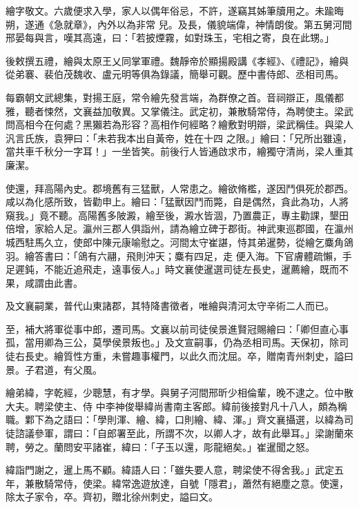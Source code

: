 \begin{pinyinscope}
 繪字敬文。六歲便求入學，家人以偶年俗忌，不許，遂竊其姊筆牘用之。未踰晦朔，遂通《急就章》，內外以為非常
 兒。及長，儀貌端偉，神情朗俊。第五舅河間邢晏每與言，嘆其高遠，曰：「若披煙霧，如對珠玉，宅相之寄，良在此甥。」



 後敕撰五禮，繪與太原王乂同掌軍禮。魏靜帝於顯揚殿講《孝經》、《禮記》，繪與從弟褰、裴伯茂魏收、盧元明等俱為錄議，簡舉可觀。歷中書侍郎、丞相司馬。



 每霸朝文武總集，對揚王庭，常令繪先發言端，為群僚之首。音祠辯正，風儀都雅，聽者悚然，文襄益加敬異。又掌儀注。武定初，兼散騎常侍，為聘使主。梁武問高相今在何處？黑獺若為形容？高相作何經略？繪敷對明辯，梁武稱佳。與梁人汎言氏族，袁狎曰：「未若我本出自黃帝，姓在十四
 之限。」繪曰：「兄所出雖遠，當共車千秋分一字耳！」一坐皆笑。前後行人皆通啟求市，繪獨守清尚，梁人重其廉潔。



 使還，拜高陽內史。郡境舊有三猛獸，人常患之。繪欲脩檻，遂因鬥俱死於郡西。咸以為化感所致，皆勸申上。繪曰：「猛獸因鬥而斃，自是偶然，貪此為功，人將窺我。」竟不聽。高陽舊多陂澱，繪至後，澱水皆涸，乃置農正，專主勸課，墾田倍增，家給人足。瀛州三郡人俱詣州，請為繪立碑于郡街。神武東巡郡國，在瀛州城西駐馬久立，使郎中陳元康喻慰之。河間太守崔諶，恃其弟暹勢，從繪乞麋角鴿羽。繪答書曰：「鴿有六翮，飛則沖天；麋有四足，走
 便入海。下官膚體疏懶，手足遲鈍，不能近追飛走，遠事佞人。」時文襄使暹選司徒左長史，暹薦繪，既而不果，咸謂由此書。



 及文襄嗣業，普代山東諸郡，其特降書徵者，唯繪與清河太守辛術二人而已。



 至，補大將軍從事中郎，遷司馬。文襄以前司徒侯景進賢冠賜繪曰：「卿但直心事孤，當用卿為三公，莫學侯景叛也。」及文宣嗣事，仍為丞相司馬。天保初，除司徒右長史。繪質性方重，未嘗趣事權門，以此久而沈屈。卒，贈南青州刺史，謚曰景。子君道，有父風。



 繪弟緯，字乾經，少聰慧，有才學。與舅子河間邢昕少相倫輩，晚不逮之。位中散大夫。聘梁使主、侍
 中李神俊舉緯尚書南主客郎。緯前後接對凡十八人，頗為稱職。鄴下為之語曰：「學則渾、繪、緯，口則繪、緯、渾。」齊文襄攝選，以緯為司徒諮議參軍，謂曰：「自郎署至此，所謂不次，以卿人才，故有此舉耳。」梁謝蘭來聘，勞之。蘭問安平諸崔，緯曰：「子玉以還，彫龍絕矣。」崔暹聞之怒。



 緯詣門謝之，暹上馬不顧。緯語人曰：「雖失要人意，聘梁使不得舍我。」武定五年，兼散騎常侍，使梁。緯常逸遊放達，自號「隱君」，蕭然有絕塵之意。使還，除太子家令，卒。齊初，贈北徐州刺史，謚曰文。




\end{pinyinscope}
